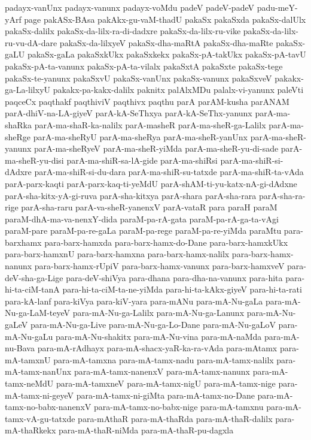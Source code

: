 {padayx-vanUnx
padayx-vanunx
padayx-voMdu
padeV
padeV-padeV
padu-meY-yArf
page
pakASx-BAsa
pakAkx-gu-vaM-thadU
pakaSx
pakaSxda
pakaSx-dalUlx
pakaSx-dalilx
pakaSx-da-lilx-ra-di-dadxre
pakaSx-da-lilx-ru-vike
pakaSx-da-lilx-ru-vu-dA-dare
pakaSx-da-lilxyeV
pakaSx-dha-maRtA
pakaSx-dha-maRte
pakaSx-gaLU
pakaSx-gaLa
pakaSxkUkx
pakaSxkekx
pakaSx-pA-takUkx
pakaSx-pA-tavU
pakaSx-pA-ta-vanunx
pakaSx-pA-ta-vilalx
pakaSxtA
pakaSxte
pakaSx-tege
pakaSx-te-yanunx
pakaSxvU
pakaSx-vanUnx
pakaSx-vanunx
pakaSxveV
pakakx-ga-La-lilxyU
pakakx-pa-kakx-dalilx
paknitx
palAlxMDu
palalx-vi-yanunx
paleVti
paqceCx
paqthakf
paqthiviV
paqthivx
paqthu
parA
parAM-kusha
parANAM
parA-dhiV-na-LA-giyeV
parA-kA-SeThxya
parA-kA-SeThx-yanunx
parA-ma-shaRka
parA-ma-shaR-ka-nalilx
parA-masheR
parA-ma-sheR-ga-Lalilx
parA-ma-sheRge
parA-ma-sheRyU
parA-ma-sheRya
parA-ma-sheR-yanUnx
parA-ma-sheR-yanunx
parA-ma-sheRyeV
parA-ma-sheR-yiMda
parA-ma-sheR-yu-di-sade
parA-ma-sheR-yu-disi
parA-ma-shiR-sa-lA-gide
parA-ma-shiRsi
parA-ma-shiR-si-dAdxre
parA-ma-shiR-si-du-dara
parA-ma-shiR-su-tatxde
parA-ma-shiR-ta-vAda
parA-parx-kaqti
parA-parx-kaq-ti-yeMdU
parA-shAM-ti-yu-katx-nA-gi-dAdxne
parA-sha-kitx-yA-gi-ruva
parA-sha-kitxya
parA-shara
parA-sha-rara
parA-sha-ra-rige
parA-sha-raru
parA-va-sheR-yanenxV
parA-vataR
para
paraH
paraM
paraM-dhA-ma-va-nenxY-dida
paraM-pa-rA-gata
paraM-pa-rA-ga-ta-vAgi
paraM-pare
paraM-pa-re-gaLa
paraM-pa-rege
paraM-pa-re-yiMda
paraMtu
para-barxhamx
para-barx-hamxda
para-barx-hamx-do-Dane
para-barx-hamxkUkx
para-barx-hamxnU
para-barx-hamxna
para-barx-hamx-nalilx
para-barx-hamx-nanunx
para-barx-hamx-rUpiV
para-barx-hamx-vanunx
para-barx-hamxveV
para-deV-sha-ga-Lige
para-deV-shiVya
para-dhana
para-dha-na-vanunx
para-hita
para-hi-ta-ciM-tanA
para-hi-ta-ciM-ta-ne-yiMda
para-hi-ta-kAkx-giyeV
para-hi-ta-rati
para-kA-lanf
para-kiVya
para-kiV-yara
para-mANu
para-mA-Nu-gaLa
para-mA-Nu-ga-LaM-teyeV
para-mA-Nu-ga-Lalilx
para-mA-Nu-ga-Lanunx
para-mA-Nu-gaLeV
para-mA-Nu-ga-Live
para-mA-Nu-ga-Lo-Dane
para-mA-Nu-gaLoV
para-mA-Nu-gaLu
para-mA-Nu-shakitx
para-mA-Nu-vina
para-mA-naMda
para-mA-nu-Bava
para-mA-rAdhayx
para-mA-shacx-yaR-ka-ra-vAda
para-mAtamx
para-mA-tamxnU
para-mA-tamxna
para-mA-tamx-nadu
para-mA-tamx-nalilx
para-mA-tamx-nanUnx
para-mA-tamx-nanenxV
para-mA-tamx-nanunx
para-mA-tamx-neMdU
para-mA-tamxneV
para-mA-tamx-nigU
para-mA-tamx-nige
para-mA-tamx-ni-geyeV
para-mA-tamx-ni-giMta
para-mA-tamx-no-Dane
para-mA-tamx-no-babx-nanenxV
para-mA-tamx-no-babx-nige
para-mA-tamxnu
para-mA-tamx-vA-gu-tatxde
para-mAthaR
para-mA-thaRda
para-mA-thaR-dalilx
para-mA-thaRkekx
para-mA-thaR-niMda
para-mA-thaR-pu-dagxla
}
